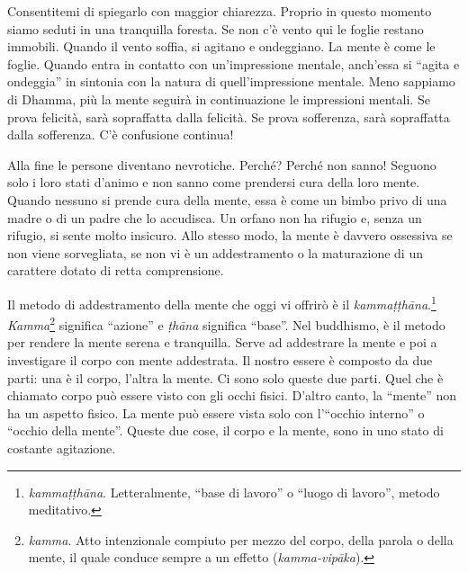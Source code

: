 Consentitemi di spiegarlo con maggior chiarezza. Proprio in questo
momento siamo seduti in una tranquilla foresta. Se non c'è vento qui le
foglie restano immobili. Quando il vento soffia, si agitano e
ondeggiano. La mente è come le foglie. Quando entra in contatto con
un'impressione mentale, anch'essa si ``agita e ondeggia'' in sintonia
con la natura di quell'impressione mentale. Meno sappiamo di Dhamma, più
la mente seguirà in continuazione le impressioni mentali. Se prova
felicità, sarà sopraffatta dalla felicità. Se prova sofferenza, sarà
sopraffatta dalla sofferenza. C'è confusione continua!

Alla fine le persone diventano nevrotiche. Perché? Perché non sanno!
Seguono solo i loro stati d'animo e non sanno come prendersi cura della
loro mente. Quando nessuno si prende cura della mente, essa è come un
bimbo privo di una madre o di un padre che lo accudisca. Un orfano non
ha rifugio e, senza un rifugio, si sente molto insicuro. Allo stesso
modo, la mente è davvero ossessiva se non viene sorvegliata, se non vi è
un addestramento o la maturazione di un carattere dotato di retta
comprensione.

Il metodo di addestramento della mente che oggi vi offrirò è il
\emph{kammaṭṭhāna}.\footnote{\emph{kammaṭṭhāna}. Letteralmente, ``base
  di lavoro'' o ``luogo di lavoro'', metodo meditativo.}
\emph{Kamma}\footnote{\emph{kamma}. Atto intenzionale compiuto per mezzo
  del corpo, della parola o della mente, il quale conduce sempre a un
  effetto (\emph{kamma-vipāka}).} significa ``azione'' e \emph{ṭhāna}
significa ``base''. Nel buddhismo, è il metodo per rendere la mente
serena e tranquilla. Serve ad addestrare la mente e poi a investigare il
corpo con mente addestrata. Il nostro essere è composto da due parti:
una è il corpo, l'altra la mente. Ci sono solo queste due parti. Quel
che è chiamato corpo può essere visto con gli occhi fisici. D'altro
canto, la ``mente'' non ha un aspetto fisico. La mente può essere vista
solo con l'``occhio interno'' o ``occhio della mente''. Queste due cose,
il corpo e la mente, sono in uno stato di costante agitazione.

